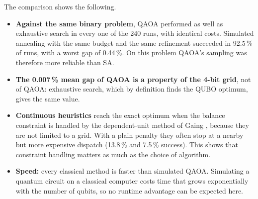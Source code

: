 The comparison shows the following.
\begin{itemize}
\item \textbf{Against the same binary problem}, QAOA performed as well as exhaustive search in every one of the 240 runs, with identical costs. Simulated annealing with the same budget and the same refinement succeeded in 92.5\,\% of runs, with a worst gap of 0.44\,\%. On this problem QAOA's sampling was therefore more reliable than SA.
\item \textbf{The 0.007\,\% mean gap of QAOA is a property of the 4-bit grid}, not of QAOA: exhaustive search, which by definition finds the QUBO optimum, gives the same value.
\item \textbf{Continuous heuristics} reach the exact optimum when the balance constraint is handled by the dependent-unit method of Gaing \cite{gaing2003}, because they are not limited to a grid. With a plain penalty they often stop at a nearby but more expensive dispatch (13.8\,\% and 7.5\,\% success). This shows that constraint handling matters as much as the choice of algorithm.
\item \textbf{Speed:} every classical method is faster than simulated QAOA. Simulating a quantum circuit on a classical computer costs time that grows exponentially with the number of qubits, so no runtime advantage can be expected here.
\end{itemize}

